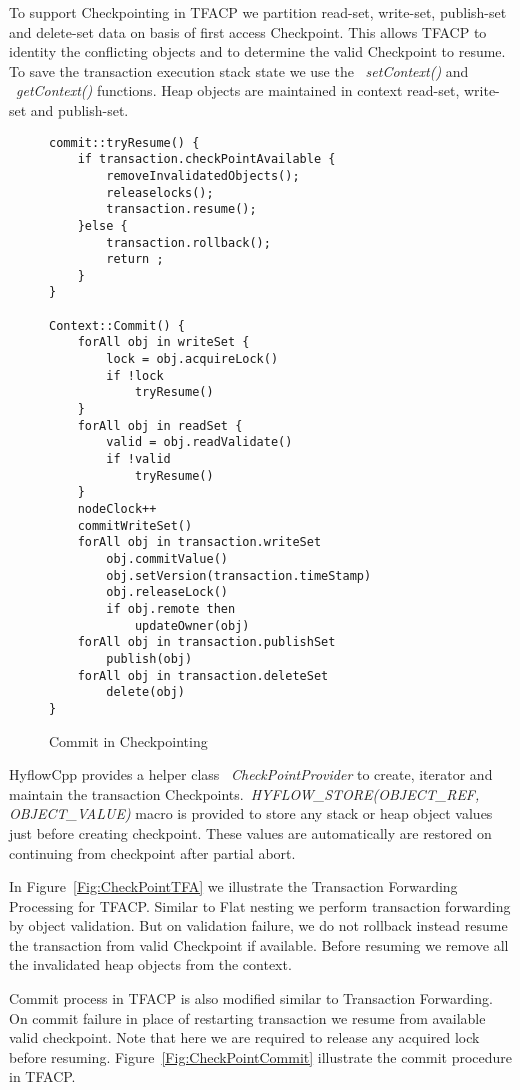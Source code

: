 \documentclass[12pt,english]{report}
\begin{document}
To support Checkpointing in TFACP we partition read-set, write-set, publish-set and delete-set data on basis of first access Checkpoint. This allows TFACP to identity the conflicting objects and to determine the valid Checkpoint to resume. To save the transaction execution stack state we use the ~\emph{setContext()} and ~\emph{getContext()} functions. Heap objects are maintained in context read-set, write-set and publish-set. 

\begin{figure}
\begin{minipage}[b]{0.9\linewidth}\centering
\begin{lstlisting}
commit::tryResume() {
	if transaction.checkPointAvailable {
		removeInvalidatedObjects();
		releaselocks();
		transaction.resume();
	}else {
		transaction.rollback();
		return ;
	}		
}

Context::Commit() {
	forAll obj in writeSet {
		lock = obj.acquireLock()
		if !lock
			tryResume()
	}
	forAll obj in readSet {
		valid = obj.readValidate()
		if !valid
			tryResume()
	}
	nodeClock++
	commitWriteSet()
	forAll obj in transaction.writeSet
		obj.commitValue()
 		obj.setVersion(transaction.timeStamp)
 		obj.releaseLock()
 		if obj.remote then
 			updateOwner(obj)
	forAll obj in transaction.publishSet
		publish(obj)
	forAll obj in transaction.deleteSet
		delete(obj)
}
\end{lstlisting}
\end{minipage}
\caption{Commit in Checkpointing}
\label{Fig:CheckpointCommit}
\end{figure}

HyflowCpp provides a helper class ~\emph{CheckPointProvider} to create, iterator and maintain the transaction Checkpoints.~\emph{HYFLOW{\_}STORE(OBJECT{\_}REF, OBJECT{\_}VALUE)} macro is provided to store any stack or heap object values just before creating checkpoint. These values are automatically are restored on continuing from checkpoint after partial abort.     

In Figure~\ref{Fig:CheckPointTFA} we illustrate the Transaction Forwarding Processing for TFACP. Similar to Flat nesting we perform transaction forwarding by object validation. But on validation failure, we do not rollback instead resume the transaction from valid Checkpoint if available. Before resuming we remove all the invalidated heap objects from the context.

Commit process in TFACP is also modified similar to Transaction Forwarding. On commit failure in place of restarting transaction we resume from available valid checkpoint. Note that here we are required to release any acquired lock before resuming. Figure~\ref{Fig:CheckPointCommit} illustrate the commit procedure in TFACP. 
\end{document}
